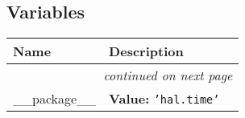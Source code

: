   \subsection{Variables}

    \vspace{-1cm}
\hspace{\varindent}\begin{longtable}{|p{\varnamewidth}|p{\vardescrwidth}|l}
\cline{1-2}
\cline{1-2} \centering \textbf{Name} & \centering \textbf{Description}& \\
\cline{1-2}
\endhead\cline{1-2}\multicolumn{3}{r}{\small\textit{continued on next page}}\\\endfoot\cline{1-2}
\endlastfoot\raggedright \_\-\_\-p\-a\-c\-k\-a\-g\-e\-\_\-\_\- & \raggedright \textbf{Value:} 
{\tt \texttt{'}\texttt{hal.time}\texttt{'}}&\\
\cline{1-2}
\end{longtable}

